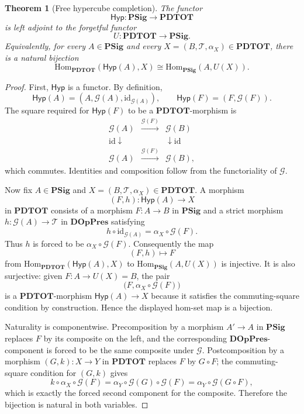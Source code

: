 \documentclass[11pt]{article}
\newcommand{\Hyp}{\mathsf{Hyp}}
\newtheorem{theorem}[definition]{Theorem}
\begin{document}
\begin{theorem}[Free hypercube completion]
\label{thm:free-hyp-full}
The functor
\[
  \Hyp:\mathbf{PSig}\longrightarrow\mathbf{PDTOT}
\]
is left adjoint to the forgetful functor
\[
  U:\mathbf{PDTOT}\longrightarrow\mathbf{PSig}.
\]
Equivalently, for every \(A\in\mathbf{PSig}\) and every
\(X=(B,\mathcal{T},\alpha_X)\in\mathbf{PDTOT}\), there is a natural bijection
\[
  \mathrm{Hom}_{\mathbf{PDTOT}}(\Hyp(A),X)
  \cong
  \mathrm{Hom}_{\mathbf{PSig}}(A,U(X)).
\]
\end{theorem}

\begin{proof}
First, \(\Hyp\) is a functor.  By definition,
\[
  \Hyp(A)=(A,\mathcal{G}(A),\mathrm{id}_{\mathcal{G}(A)}),
  \qquad
  \Hyp(F)=(F,\mathcal{G}(F)).
\]
The square required for \(\Hyp(F)\) to be a \(\mathbf{PDTOT}\)-morphism is
\[
\begin{array}{ccc}
  \mathcal{G}(A) & \xrightarrow{\mathcal{G}(F)} & \mathcal{G}(B) \\
  {\scriptstyle \mathrm{id}}\downarrow & & \downarrow{\scriptstyle \mathrm{id}} \\
  \mathcal{G}(A) & \xrightarrow{\mathcal{G}(F)} & \mathcal{G}(B),
\end{array}
\]
which commutes.  Identities and composition follow from the functoriality of
\(\mathcal{G}\).

Now fix \(A\in\mathbf{PSig}\) and
\(X=(B,\mathcal{T},\alpha_X)\in\mathbf{PDTOT}\).  A morphism
\[
  (F,h):\Hyp(A)\to X
\]
in \(\mathbf{PDTOT}\) consists of a morphism \(F:A\to B\) in
\(\mathbf{PSig}\) and a strict morphism \(h:\mathcal{G}(A)\to\mathcal{T}\) in
\(\mathbf{DOpPres}\) satisfying
\[
  h\circ \mathrm{id}_{\mathcal{G}(A)}
  =
  \alpha_X\circ\mathcal{G}(F).
\]
Thus \(h\) is forced to be \(\alpha_X\circ\mathcal{G}(F)\).  Consequently the
map
\[
  (F,h)\longmapsto F
\]
from \(\mathrm{Hom}_{\mathbf{PDTOT}}(\Hyp(A),X)\) to
\(\mathrm{Hom}_{\mathbf{PSig}}(A,U(X))\) is injective.  It is also surjective:
given \(F:A\to U(X)=B\), the pair
\[
  \bigl(F,\alpha_X\circ\mathcal{G}(F)\bigr)
\]
is a \(\mathbf{PDTOT}\)-morphism \(\Hyp(A)\to X\) because it satisfies the
commuting-square condition by construction.  Hence the displayed hom-set map is
a bijection.

Naturality is componentwise.  Precomposition by a morphism \(A'\to A\) in
\(\mathbf{PSig}\) replaces \(F\) by its composite on the left, and the
corresponding \(\mathbf{DOpPres}\)-component is forced to be the same composite
under \(\mathcal{G}\).  Postcomposition by a morphism
\((G,k):X\to Y\) in \(\mathbf{PDTOT}\) replaces \(F\) by \(G\circ F\); the
commuting-square condition for \((G,k)\) gives
\[
  k\circ\alpha_X\circ\mathcal{G}(F)
  =
  \alpha_Y\circ\mathcal{G}(G)\circ\mathcal{G}(F)
  =
  \alpha_Y\circ\mathcal{G}(G\circ F),
\]
which is exactly the forced second component for the composite.  Therefore the
bijection is natural in both variables.


\end{proof}
\end{document}
